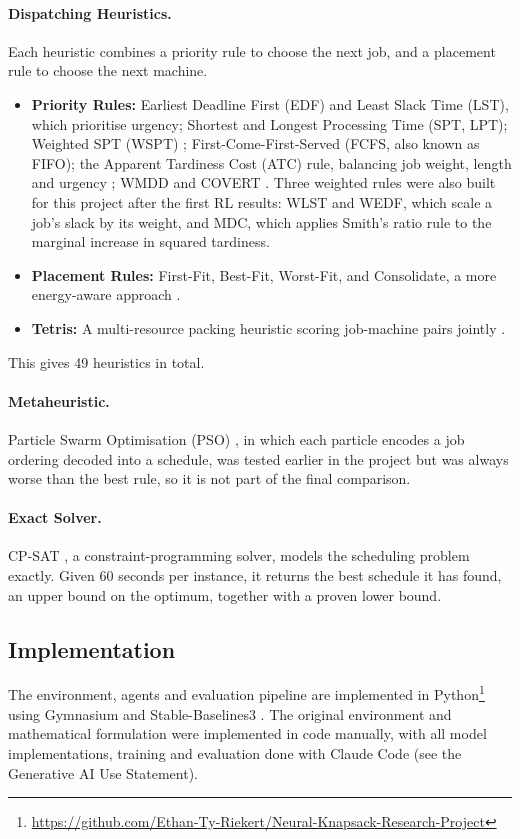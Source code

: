\documentclass[12pt]{article}
\begin{document}
\paragraph{Dispatching Heuristics.} Each heuristic combines a priority rule to choose the next job, and a placement rule to choose the next machine.
\begin{itemize}
    \item \textbf{Priority Rules:} Earliest Deadline First (EDF) and Least Slack Time (LST), which prioritise urgency; Shortest and Longest Processing Time (SPT, LPT); Weighted SPT (WSPT) \cite{smith1956wspt}; First-Come-First-Served (FCFS, also known as FIFO); the Apparent Tardiness Cost (ATC) rule, balancing job weight, length and urgency \cite{vepsalainen1987atc}; WMDD \cite{kanet2004wmdd} and COVERT \cite{carroll1965covert}. Three weighted rules were also built for this project after the first RL results: WLST and WEDF, which scale a job's slack by its weight, and MDC, which applies Smith's ratio rule \cite{smith1956wspt} to the marginal increase in squared tardiness.
    \item \textbf{Placement Rules:} First-Fit, Best-Fit, Worst-Fit, and Consolidate, a more energy-aware approach \cite{energyaware2012}.
    \item \textbf{Tetris:} A multi-resource packing heuristic scoring job-machine pairs jointly \cite{grandl2014tetris}.
\end{itemize}
This gives 49 heuristics in total.

\paragraph{Metaheuristic.} Particle Swarm Optimisation (PSO) \cite{kennedy1995pso}, in which each particle encodes a job ordering decoded into a schedule, was tested earlier in the project but was always worse than the best rule, so it is not part of the final comparison.

\paragraph{Exact Solver.} CP-SAT \cite{ortools}, a constraint-programming solver, models the scheduling problem exactly. Given 60 seconds per instance, it returns the best schedule it has found, an upper bound on the optimum, together with a proven lower bound.

\subsection{Implementation}\label{sec:implementation}
The environment, agents and evaluation pipeline are implemented in Python\footnote{\url{https://github.com/Ethan-Ty-Riekert/Neural-Knapsack-Research-Project}} using Gymnasium and Stable-Baselines3 \cite{raffin2021sb3}. The original environment and mathematical formulation were implemented in code manually, with all model implementations, training and evaluation done with Claude Code (see the Generative AI Use Statement).
\end{document}
